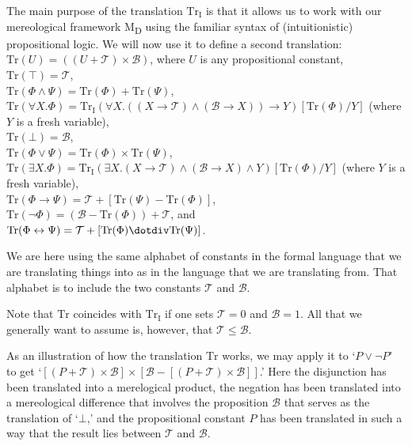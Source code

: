 \documentclass[12pt]{book}
\begin{document}
The main purpose of the translation $\mathrm{Tr_I}$ is that it allows us to work with our mereological framework M\textsubscript{D} using the familiar syntax of (intuitionistic) propositional logic. We will now use it to define a second translation:\\
\indent $\mathrm{Tr}(U) = ((U + \mathcal{T}) \times \mathcal{B})$, where $U$ is any propositional constant,\\
\indent $\mathrm{Tr}(\top) = \mathcal{T}$,\\
\indent $\mathrm{Tr}(\Phi \wedge \Psi) = \mathrm{Tr}(\Phi) + \mathrm{Tr}(\Psi)$,\\
\indent $\mathrm{Tr}(\forall X.\Phi) = \mathrm{Tr_I}(\forall X.((X \rightarrow \mathcal{T}) \wedge (\mathcal{B} \rightarrow X)) \rightarrow Y)[\mathrm{Tr}(\Phi) / Y]$ (where $Y$ is a fresh variable),\\
\indent $\mathrm{Tr}(\bot) = \mathcal{B}$,\\
\indent $\mathrm{Tr}(\Phi \vee \Psi) = \mathrm{Tr}(\Phi) \times \mathrm{Tr}(\Psi)$,\\
\indent $\mathrm{Tr}(\exists X.\Phi) = \mathrm{Tr_I}(\exists X.(X \rightarrow \mathcal{T}) \wedge (\mathcal{B} \rightarrow X) \wedge Y)[\mathrm{Tr}(\Phi) / Y]$ (where $Y$ is a fresh variable),\\
\indent $\mathrm{Tr}(\Phi \rightarrow \Psi) = \mathcal{T} + [\mathrm{Tr}(\Psi) - \mathrm{Tr}(\Phi)]$,\\
\indent $\mathrm{Tr}(\neg \Phi) = (\mathcal{B} - \mathrm{Tr}(\Phi)) + \mathcal{T}$, and\\
\indent $\mathrm{Tr}(\Phi \leftrightarrow \Psi) = \mathcal{T} + [\mathrm{Tr}(\Phi) \dotdiv \mathrm{Tr}(\Psi)]$.

We are here using the same alphabet of constants in the formal language that we are translating things into as in the language that we are translating from. That alphabet is to include the two constants $\mathcal{T}$ and $\mathcal{B}$.

Note that $\mathrm{Tr}$ coincides with $\mathrm{Tr_I}$ if one sets $\mathcal{T} = 0$ and $\mathcal{B} = 1$. All that we generally want to assume is, however, that $\mathcal{T} \le \mathcal{B}$.

As an illustration of how the translation $\mathrm{Tr}$ works, we may apply it to `$P \vee \neg P$' to get `$[(P + \mathcal{T}) \times \mathcal{B}] \times [\mathcal{B} - [(P + \mathcal{T}) \times \mathcal{B}]]$.' Here the disjunction has been translated into a merelogical product, the negation has been translated into a mereological difference that involves the proposition $\mathcal{B}$ that serves as the translation of `$\bot$,' and the propositional constant $P$ has been translated in such a way that the result lies between $\mathcal{T}$ and $\mathcal{B}$.
\end{document}
